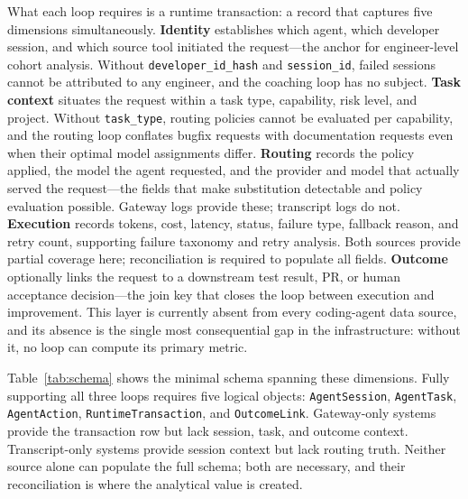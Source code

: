\documentclass[sigconf,anonymous,review]{acmart}
\begin{document}
What each loop requires is a runtime transaction: a record
that captures five dimensions simultaneously. \textbf{Identity}
establishes which agent, which developer session, and which source
tool initiated the request---the anchor for engineer-level cohort
analysis. Without \texttt{developer\_id\_hash} and
\texttt{session\_id}, failed sessions cannot be attributed to any
engineer, and the coaching loop has no subject.
\textbf{Task context} situates the request within a task type,
capability, risk level, and project. Without \texttt{task\_type},
routing policies cannot be evaluated per capability, and the routing
loop conflates bugfix requests with documentation requests even when
their optimal model assignments differ.
\textbf{Routing} records the policy applied, the model the agent
requested, and the provider and model that actually served the
request---the fields that make substitution detectable and policy
evaluation possible. Gateway logs provide these; transcript logs do
not.
\textbf{Execution} records tokens, cost, latency,
status, failure type, fallback reason, and retry count, supporting
failure taxonomy and retry analysis. Both sources provide partial
coverage here; reconciliation is required to populate all fields.
\textbf{Outcome} optionally links the request to a downstream test
result, PR, or human acceptance decision---the join key that closes
the loop between execution and improvement.
This layer is currently absent from every coding-agent data source,
and its absence is the single most consequential gap in the
infrastructure: without it, no loop can compute its primary metric.

Table~\ref{tab:schema} shows the minimal schema spanning these
dimensions. Fully supporting all three loops requires five logical
objects: \texttt{AgentSession}, \texttt{AgentTask},
\texttt{AgentAction}, \texttt{RuntimeTransaction}, and
\texttt{OutcomeLink}. Gateway-only systems provide the transaction
row but lack session, task, and outcome context. Transcript-only
systems provide session context but lack routing truth. Neither
source alone can populate the full schema; both are necessary, and
their reconciliation is where the analytical value is created.
\end{document}
